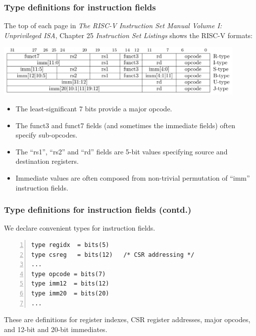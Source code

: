 \documentclass[aspectratio=169]{beamer}
\newcommand{\slidefont}{\scriptsize}
\begin{document}
\begin{frame}[fragile]
  \frametitle{Type definitions for instruction fields}

  \slidefont

  The top of each page in \emph{The RISC-V Instruction Set Manual
    Volume I: Unprivileged ISA}, Chapter 25 \emph{Instruction Set
    Listings} shows the RISC-V formats:

  \vspace{1ex}

  \begin{center}
    \includegraphics[height=1in]{Figures/Fig_RISCV_formats.png}
  \end{center}

  \vspace{1ex}

  \begin{minipage}{\textwidth}
    \begin{itemize}
    \item The least-significant 7 bits provide a major opcode.
    \item The funct3 and funct7 fields (and sometimes the immediate fields) often
      specify sub-opcodes.
    \item The ``rs1'', ``rs2'' and ``rd'' fields are 5-bit values specifying source and destination registers.
    \item Immediate values are often composed from non-trivial permutation of ``imm'' instruction fields.
    \end{itemize}

  \end{minipage}

\end{frame}


\begin{frame}[fragile]
  \frametitle{Type definitions for instruction fields (contd.)}

  \slidefont

  We declare convenient types for instruction fields.

  \begin{Verbatim}[frame=single, numbers=left, label = File riscv\_types.sail]
type regidx  = bits(5)
type csreg   = bits(12)   /* CSR addressing */
...
type opcode = bits(7)
type imm12  = bits(12)
type imm20  = bits(20)
...
  \end{Verbatim}

  \begin{minipage}{\textwidth}
    These are definitions for register indexes, CSR register
    addresses, major opcodes, and 12-bit and 20-bit immediates.
  \end{minipage}

\end{frame}
\end{document}
